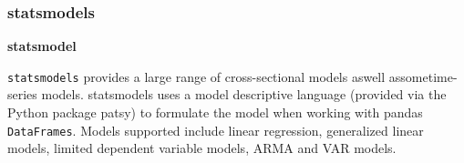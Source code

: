 \documentclass{beamer}
\begin{document}
 
 \frametitle{statsmodels}
  
 \textbf{statsmodel}
  
   \texttt{statsmodels} provides a large range of cross-sectional models aswell assometime-series models. 
   statsmodels
  uses a model descriptive language (provided via the Python package patsy) to formulate the model
  when working with pandas \texttt{DataFrames}.
   Models supported include linear regression, generalized linear
  models, limited dependent variable models, ARMA and VAR models.
  
 

%
%

%





\end{document}

